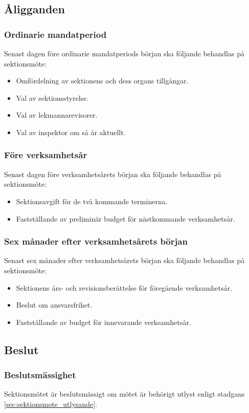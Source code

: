 \documentclass[a4paper]{dtek}
\begin{document}
\subsection{Åligganden}
\subsubsection{Ordinarie mandatperiod}
Senast dagen före ordinarie mandatperiods början ska följande behandlas på sektionsmöte:
\begin{itemize}
\item Omfördelning av sektionens och dess organs tillgångar.
\item Val av sektionsstyrelse.
\item Val av lekmannarevisorer.
\item Val av inspektor om så är aktuellt.
\end{itemize}
\subsubsection{Före verksamhetsår}
Senast dagen före verksamhetsårets början ska följande behandlas på sektionsmöte:
\begin{itemize}
\item Sektionsavgift för de två kommande terminerna.
\item Fastställande av preliminär budget för nästkommande verksamhetsår.
\end{itemize}
\subsubsection{Sex månader efter verksamhetsårets början}
Senast sex månader efter verksamhetsårets början ska följande behandlas på sektionsmöte:
\begin{itemize}
\item Sektionens års- och revisionsberättelse för föregående verksamhetsår.
\item Beslut om ansvarsfrihet.
\item Fastställande av budget för innevarande verksamhetsår.
\end{itemize}
\subsection{Beslut}
\subsubsection{Beslutsmässighet}
Sektionsmötet är beslutsmässigt om mötet är behörigt utlyst enligt stadgans \ref{sec:sektionsmote_utlysande}.
\end{document}

